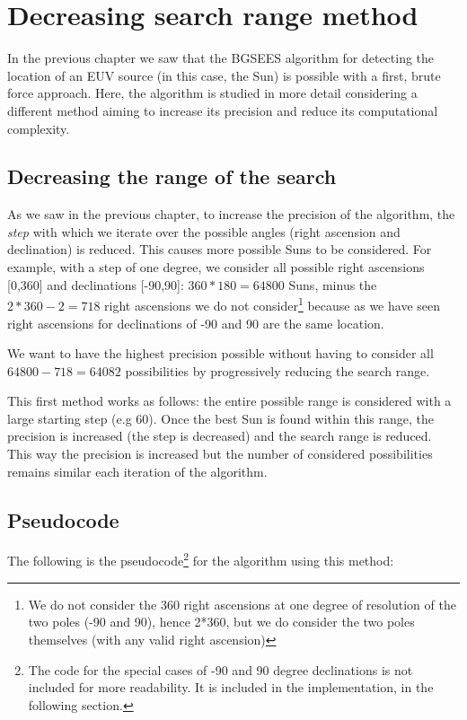 \chapter{Decreasing search range method}\label{decRangeChapter}

In the previous chapter we saw that the BGSEES algorithm for detecting the location of an EUV source (in this case, the Sun) is possible with a first, brute force approach. Here, the algorithm is studied in more detail considering a different method aiming to increase its precision and reduce its computational complexity.

\section{Decreasing the range of the search}

As we saw in the previous chapter, to increase the precision of the algorithm, the \textit{step} with which we iterate over the possible angles (right ascension and declination) is reduced. This causes more possible Suns to be considered. For example, with a step of one degree, we consider all possible right ascensions [0,360] and declinations [-90,90]: $360*180 = 64800$ Suns, minus the $2*360 - 2 = 718$ right ascensions we do not consider\footnote{We do not consider the 360 right ascensions at one degree of resolution of the two poles (-90 and 90), hence 2*360, but we do consider the two poles themselves (with any valid right ascension)} because as we have seen right ascensions for declinations of -90 and 90 are the same location.

We want to have the highest precision possible without having to consider all $64800 - 718 = 64082$ possibilities by progressively reducing the search range.

This first method works as follows: the entire possible range is considered with a large starting step (e.g 60). Once the best Sun is found within this range, the precision is increased (the step is decreased) and the search range is reduced. This way the precision is increased but the number of considered possibilities remains similar each iteration of the algorithm.

\section{Pseudocode}

The following is the pseudocode\footnote{The code for the special cases of -90 and 90 degree declinations is not included for more readability. It is included in the implementation, in the following section.} for the algorithm using this method:

